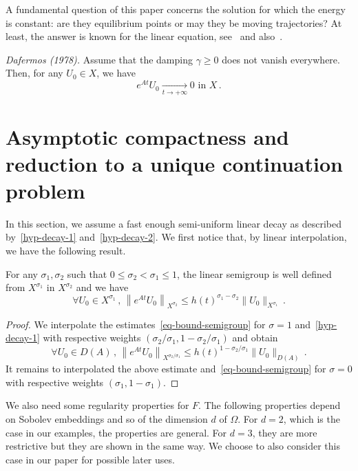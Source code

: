 \documentclass[AHL,Unicode,longabstracts]{cedram}
\let\oldforall\forall
\renewcommand*{\forall}{\mathrel{\oldforall}}
\begin{document}
A fundamental question of this paper concerns the solution for which the energy is constant: are they equilibrium points or may they be moving trajectories? At least, the answer is known for the linear equation, see~\cite{Dafermos} and also~\cite{Haraux}.

\begin{theo}\label{th-stab-linear}
\emph{Dafermos (1978).}
Assume that the damping $\gamma\geq 0$ does not vanish everywhere. Then, for any $U_0\in X$, we have
\[
e^{At}U_0\xrightarrow[t\longrightarrow +\infty]{} 0\text{ in }X\,.
\]
\end{theo}



\section{Asymptotic compactness and reduction to a unique continuation problem}\label{section-asymp-compact}

In this section, we assume a fast enough semi-uniform linear decay as described by~\eqref{hyp-decay-1} and~\eqref{hyp-decay-2}. We first notice that, by linear interpolation, we have the following result.

\begin{prop}\label{prop-decay-interpole}
For any $\sigma_1,\sigma_2$ such that $0\leq \sigma_2<\sigma_1 \leq 1$, the linear semigroup is well defined from $X^{\sigma_1}$ in $X^{\sigma_2}$ and we have
\[
\forall U_0\in X^{\sigma_1}\,,\,\left\|e^{At}U_0\right\|_{X^{\sigma_2}} \leq
h(t)^{\sigma_1-\sigma_2} \|U_0\|_{X^{\sigma_1}}\,.
\]
\end{prop}
\begin{proof}
We interpolate the estimates~\eqref{eq-bound-semigroup} for $\sigma=1$ and~\eqref{hyp-decay-1} with respective weights $(\sigma_2/\sigma_1,1-\sigma_2/\sigma_1)$ and obtain
\[
\forall U_0\in D(A)\,,\,\left\|e^{At}U_0\right\|_{X^{\sigma_2/\sigma_1}} \leq
h(t)^{1-\sigma_2/\sigma_1}\|U_0\|_{D(A)}\,.
\]
It remains to interpolated the above estimate and~\eqref{eq-bound-semigroup} for $\sigma=0$ with respective weights $(\sigma_1,1-\sigma_1)$.
\end{proof}



We also need some regularity properties for $F$. The following properties depend on Sobolev embeddings and so of the dimension $d$ of $\Omega$. For $d=2$, which is the case in our examples, the properties are general. For $d=3$, they are more restrictive but they are shown in the same way. We choose to also consider this case in our paper for possible later uses.
\end{document}
